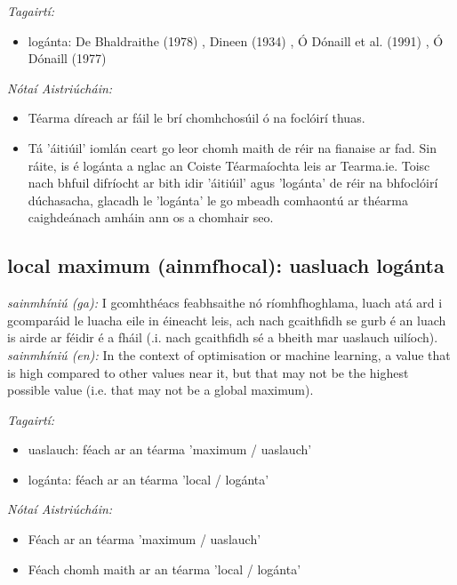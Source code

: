 \documentclass{article}
\begin{document}
 \noindent \textit{Tagairtí:}
\begin{itemize}
	\item logánta: De Bhaldraithe (1978) \cite{de-bhaldraithe}, Dineen (1934) \cite{dineen}, Ó Dónaill et al. (1991) \cite{focloir-beag}, Ó Dónaill (1977) \cite{odonaill}
\end{itemize}

 \noindent \textit{Nótaí Aistriúcháin:}
\begin{itemize}
	\item Téarma díreach ar fáil le brí chomhchosúil ó na foclóirí thuas.
	\item Tá 'áitiúil' iomlán ceart go leor chomh maith de réir na fianaise ar fad. Sin ráite, is é logánta a nglac an Coiste Téarmaíochta leis ar Tearma.ie. Toisc nach bhfuil difríocht ar bith idir 'áitiúil' agus 'logánta' de réir na bhfoclóirí dúchasacha, glacadh le 'logánta' le go mbeadh comhaontú ar théarma caighdeánach amháin ann os a chomhair seo.
\end{itemize}


\subsection*{local maximum (ainmfhocal): uasluach logánta} 
 \noindent \textit{sainmhíniú (ga):} I gcomhthéacs feabhsaithe nó ríomhfhoghlama, luach atá ard i gcomparáid le luacha eile in éineacht leis, ach nach gcaithfidh se gurb é an luach is airde ar féidir é a fháil (.i. nach gcaithfidh sé a bheith mar uaslauch uilíoch).
\newline\newline
 \noindent \textit{sainmhíniú (en):} In the context of optimisation or machine learning, a value that is high compared to other values near it, but that may not be the highest possible value (i.e. that may not be a global maximum).
\newline

 \noindent \textit{Tagairtí:}
\begin{itemize}
	\item uaslauch: féach ar an téarma 'maximum / uaslauch'
	\item logánta: féach ar an téarma 'local / logánta'
\end{itemize}

 \noindent \textit{Nótaí Aistriúcháin:}
\begin{itemize}
	\item Féach ar an téarma 'maximum / uaslauch'
	\item Féach chomh maith ar an téarma 'local / logánta'
\end{itemize}
\end{document}
